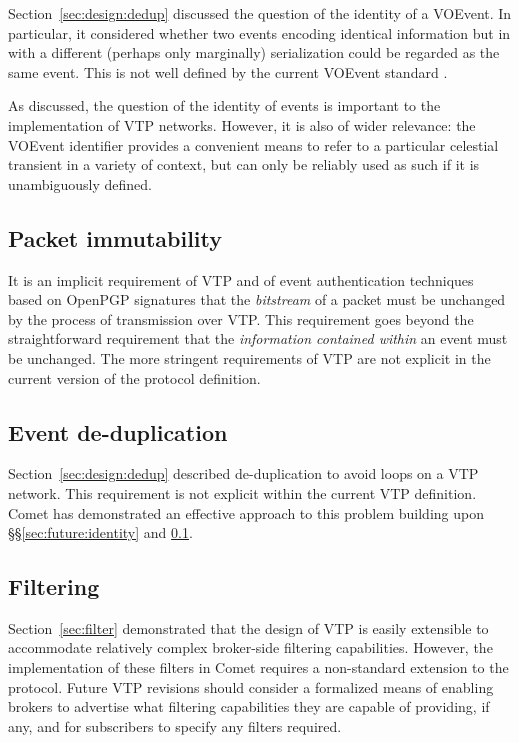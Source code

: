 \documentclass[5p,authoryear]{elsarticle}
\begin{document}
Section~\ref{sec:design:dedup} discussed the question of the identity of a
VOEvent. In particular, it considered whether two events encoding identical
information but in with a different (perhaps only marginally) serialization
could be regarded as the same event. This is not well defined by the current
VOEvent standard \citep{Seaman:2011}.

As discussed, the question of the identity of events is important to the
implementation of VTP networks. However, it is also of wider relevance: the
VOEvent identifier provides a convenient means to refer to a particular
celestial transient in a variety of context, but can only be reliably used as
such if it is unambiguously defined.

\subsection{Packet immutability}
\label{sec:future:immutability}

It is an implicit requirement of VTP and of event authentication techniques
based on OpenPGP signatures that the \textit{bitstream} of a packet must be
unchanged by the process of transmission over VTP\@. This requirement goes
beyond the straightforward requirement that the \textit{information contained
within} an event must be unchanged. The more stringent requirements of VTP are
not explicit in the current version of the protocol definition.

\subsection{Event de-duplication}
\label{sec:future:dedup}

Section~\ref{sec:design:dedup} described de-duplication to avoid loops on a
VTP network. This requirement is not explicit within the current VTP
definition. Comet has demonstrated an effective approach to this problem
building upon \S\S\ref{sec:future:identity} and \ref{sec:future:immutability}.

\subsection{Filtering}
\label{sec:future:filter}

Section~\ref{sec:filter} demonstrated that the design of VTP is easily
extensible to accommodate relatively complex broker-side filtering
capabilities. However, the implementation of these filters in Comet requires a
non-standard extension to the protocol. Future VTP revisions should consider a
formalized means of enabling brokers to advertise what filtering capabilities
they are capable of providing, if any, and for subscribers to specify any
filters required.
\end{document}
